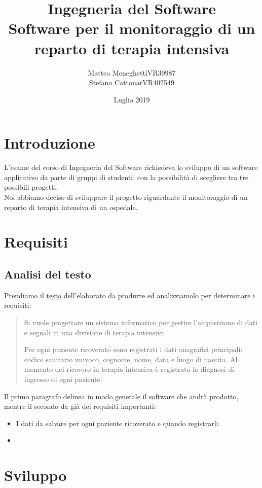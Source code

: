 \documentclass[a4paper]{report}
\title{Ingegneria del Software \\ Software  per il monitoraggio di un reparto di terapia intensiva}
\author{Matteo Meneghetti\hspace{0.2cm}VR39987 \\  Stefano Cattonar\hspace{0.2cm}VR402549}
\date{Luglio 2019}
\begin{document}
\maketitle
\tableofcontents

\chapter*{Introduzione}
    L'esame del corso di Ingegneria del Software richiedeva lo sviluppo di un software applicativo da parte di gruppi di studenti, con la possibilità di scegliere tra tre possibili progetti.\\
    Noi abbiamo deciso di sviluppare il progetto riguardante il monitoraggio di un reparto di terapia intensiva di un ospedale.
    
\chapter{Requisiti}
    \section{Analisi del testo}
        
        Prendiamo il \href{run:TerapiaIntensiva.pdf}{testo} dell'elaborato da produrre ed analizziamolo per determinare i requisiti:
        \begin{quote}
            Si vuole progettare un sistema informatico per gestire l’acquisizione di dati e segnali in una divisione di terapia intensiva.  
 
            Per ogni paziente ricoverato sono registrati i dati anagrafici principali: codice sanitario univoco, cognome, nome, data e luogo di nascita. Al momento del ricovero in terapia intensiva è registrata la diagnosi di ingresso di ogni paziente.
        \end{quote}
        Il primo paragrafo delinea in modo generale il software che andrà prodotto, mentre il secondo da già dei requisiti importanti:\\
        \begin{itemize}
            \item I dati da salvare per ogni paziente ricoverato e quando registrarli.
            \item 
        \end{itemize}
        

\chapter{Sviluppo}
\end{document}
